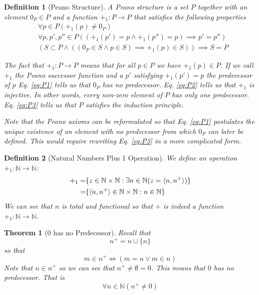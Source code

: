 \documentclass[12pt]{article}
\theoremstyle{break}
\newtheorem{definition}{Definition}[section]
\theoremstyle{break}
\newtheorem{theorem}{Theorem}[section]
\theoremstyle{break}
\theoremstyle{break}
\theoremstyle{break}
\newtheorem{informal definition}[definition]{Informal Definition}
\begin{document}
\begin{definition}[Peano Structure]
A Peano structure is a set $P$ together with an element $0_P \in P$ and a function $+_1:P\to P$ that satisfies the following properties
\begin{align}
&\forall p \in P (+_1(p) \not = 0_P)  \tag{P1}\label{eq:P1}\\
&\forall p, p', p'' \in P((+_1(p')=p \land +_1(p'')=p) \implies p'=p'') \tag{P2}\label{eq:P2}\\
& (S \subset P \land ((0_P \in S \land p \in S) \implies +_1(p) \in S)) \implies S=P \tag{P3}\label{eq:P3}
\end{align}

The fact that $+_1:P\to P$ means that for all $p\in P$ we have $+_1(p)\in P$.
If we call $+_1$ the Peano successor function and a $p'$ satisfying $+_1(p') = p$ the predecessor of $p$ Eq. \ref{eq:P1} tells us that $0_P$ has no predecessor.
Eq. \ref{eq:P2} tells us that $+_1$ is injective.
In other words, every non-zero element of $P$ has only one predecessor.
Eq. \ref{eq:P3} tells us that $P$ satisfies the induction principle.

Note that the Peano axioms can be reformulated so that Eq. \ref{eq:P1} postulates the unique existence of an element with no predecessor from which $0_P$ can later be defined.
This would require rewriting Eq. \ref{eq:P3} in a more complicated form.


\end{definition}

\begin{definition}[Natural Numbers Plus 1 Operation]
We define an operation $+_1:\mathbb{N}\to \mathbb{N}$:
\begin{align*}
+_1 =& \{z \in \mathbb{N} \times \mathbb{N}: \exists n \in \mathbb{N}(z = \braket{n, n^+})\}\\
=& \{\braket{n, n^+} \in \mathbb{N} \times \mathbb{N}: n\in \mathbb{N}\}
\end{align*}
We can see that $n$ is total and functional so that $+$ is indeed a function $+_1:\mathbb{N}\to \mathbb{N}$.
\end{definition}

\begin{theorem}[0 has no Predecessor]
\label{thm:0nopredecessor}
Recall that
$$
n^+ = n \cup \{n\}
$$
so that
$$
m\in n^+ \iff (m=n \lor m \in n)
$$
Note that $n\in n^+$ so we can see that $n^+ \not = \emptyset = 0$.
This means that $0$ has no predecessor.
That is
$$
\forall  n\in \mathbb{N}(n^+ \not= 0)
$$
\end{theorem}
\end{document}
